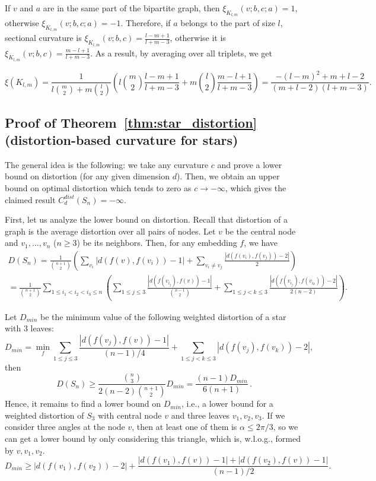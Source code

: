 \documentclass{article} %
\begin{document}
If $v$ and $a$ are in the same part of the bipartite graph, then $\xi_{K_{l,m}}(v;b,c;a) = 1$, otherwise $\xi_{K_{l,m}}(v;b,c;a) = -1$. Therefore, if $a$ belongs to the part of size $l$, sectional curvature is
$\xi_{K_{l,m}}(v;b,c) = \frac{l-m+1}{l+m-3}$, otherwise it is $\xi_{K_{l,m}}(v;b,c) = \frac{m-l+1}{l+m-3}$. As a result, by averaging over all triplets, we get

\[
\xi({K_{l,m}}) = \frac{1}{l \binom{m}{2} + m \binom{l}{2}} \left(l \binom{m}{2} \frac{l-m+1}{l+m-3} + m \binom{l}{2} \frac{m-l+1}{l+m-3}\right) = \frac{-(l - m)^2 + m + l - 2}{(m+l-2)(l+m-3)}.
\]

\subsection{Proof of Theorem~\ref{thm:star_distortion} (distortion-based curvature for stars)}\label{app:star_distortion}

The general idea is the following: we take any curvature $c$ and prove a lower bound on distortion (for any given dimension $d$). Then, we obtain an upper bound on optimal distortion which tends to zero as $c \to -\infty$, which gives the claimed result $C_d^{dist}(S_n) = -\infty$.

First, let us analyze the lower bound on distortion. Recall that distortion of a graph is the average distortion over all pairs of nodes. Let $v$ be the central node and $v_1, \ldots, v_n$ ($n \ge 3$) be its neighbors. Then, for any embedding $f$, we have
\begin{multline*}
D(S_n) = \frac{1}{\binom{n+1}{2}} \left( \sum_{v_i} {|d(f(v),f(v_i)) - 1|} + \sum_{v_i \neq v_j} \frac{|d(f(v_i),f(v_j)) - 2|}{2} \right) \\
= \frac{1}{\binom{n+1}{2}} \sum_{1 \le i_1 < i_2 < i_3 \le n} \left(
\sum_{1\le j \le 3}  \frac{|d(f(v_{i_j}),f(v)) - 1|}{{n-1 \choose 2}} +
\sum_{1\le j < k\le 3}  \frac{|d(f(v_{i_j}),f(v_{i_k})) - 2|}{2(n-2)}   \right).
\end{multline*}

Let $D_{min}$ be the minimum value of the following weighted distortion of a star with 3 leaves:
\[
D_{min} = \min_{f} \sum_{1\le j \le 3}  \frac{|d(f(v_j),f(v)) - 1|}{(n-1)/4} +
\sum_{1\le j < k\le 3}  |d(f(v_j),f(v_k)) - 2|,
\]
then 
\begin{equation}\label{eq:D_min}
D(S_n) \ge \frac{{n\choose 3}}{2(n-2){n+1 \choose 2}} D_{min} = \frac{ (n-1)D_{min}}{6(n+1)}\,.
\end{equation}
Hence, it remains to find a lower bound on $D_{min}$, i.e., a lower bound for a weighted distortion of $S_3$ with central node $v$ and three leaves $v_1, v_2, v_3$.
If we consider three angles at the node $v$, then at least one of them is $\alpha \le 2 \pi / 3$, so we can get a lower bound by only considering this triangle, which is, w.l.o.g., formed by $v, v_1, v_2$.
\[
D_{min} \ge  |d(f(v_1),f(v_2)) - 2| + \frac{|d(f(v_1),f(v)) - 1| + |d(f(v_2),f(v)) - 1|}{(n-1)/2}.
\]
\end{document}
